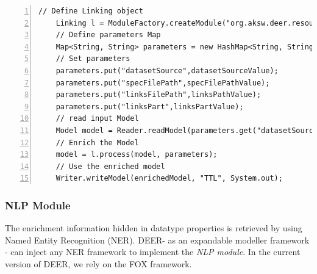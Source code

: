 \documentclass[a4paper,twoside,bibtotoc,abstracton,12pt,BCOR=15mm]{article}
\newcommand{\geolift}{\textsc{DEER}\xspace}
\begin{document}
    
    
    \begingroup
	\fontsize{8pt}{10pt}\selectfont
    \begin{lstlisting}[label=lst:Linking, float=tp, numbers=left, numberstyle=\tiny, caption = Code fragment to call the \texttt{Linking} class.]
    // Define Linking object
    Linking l = ModuleFactory.createModule("org.aksw.deer.resources.linking");
    // Define parameters Map
    Map<String, String> parameters = new HashMap<String, String>();
    // Set parameters
    parameters.put("datasetSource",datasetSourceValue);
    parameters.put("specFilePath",specFilePathValue);
    parameters.put("linksFilePath",linksPathValue);
    parameters.put("linksPart",linksPartValue);
    // read input Model
    Model model = Reader.readModel(parameters.get("datasetSource"));
    // Enrich the Model
    model = l.process(model, parameters);
    // Use the enriched model
    Writer.writeModel(enrichedModel, "TTL", System.out);
    \end{lstlisting}
    \endgroup

    \subsubsection{NLP Module}
	The enrichment information hidden in datatype properties is retrieved by using Named Entity Recognition (NER).
	\geolift - as an expandable modeller framework - can inject any NER framework to implement the \emph{NLP module}.
	In the current version of \geolift, we rely on the FOX framework. 
\end{document}
